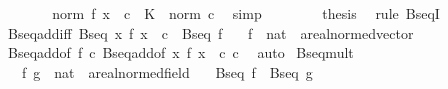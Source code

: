 \begin{isabellebody}
\ \ \ \ \isamarkupfalse%
\ \isamarkupfalse%
\ {\isachardoublequoteopen}norm\ {\isacharparenleft}{\kern0pt}f\ x\ {\isacharplus}{\kern0pt}\ c{\isacharparenright}{\kern0pt}\ {\isasymle}\ K\ {\isacharplus}{\kern0pt}\ norm\ c{\isachardoublequoteclose}\ \isamarkupfalse%
\ simp\isanewline
\ \ \isacommand{{\isacharbraceright}{\kern0pt}}\isamarkupfalse%
\isanewline
\ \ \isamarkupfalse%
\ \isamarkupfalse%
\ {\isacharquery}{\kern0pt}thesis\ \isamarkupfalse%
\ {\isacharparenleft}{\kern0pt}rule\ BseqI{\isacharprime}{\kern0pt}{\isacharparenright}{\kern0pt}\isanewline
{}\isamarkupfalse%
%
\endisatagproof
{\isafoldproof}%
%
\isadelimproof
\isanewline
%
\endisadelimproof
\isanewline
{}\isamarkupfalse%
\ Bseq{\isacharunderscore}{\kern0pt}add{\isacharunderscore}{\kern0pt}iff{\isacharcolon}{\kern0pt}\ {\isachardoublequoteopen}Bseq\ {\isacharparenleft}{\kern0pt}{\isasymlambda}x{\isachardot}{\kern0pt}\ f\ x\ {\isacharplus}{\kern0pt}\ c{\isacharparenright}{\kern0pt}\ {\isasymlongleftrightarrow}\ Bseq\ f{\isachardoublequoteclose}\isanewline
\ \ \ f\ {\isacharcolon}{\kern0pt}{\isacharcolon}{\kern0pt}\ {\isachardoublequoteopen}nat\ {\isasymRightarrow}\ {\isacharprime}{\kern0pt}a{\isacharcolon}{\kern0pt}{\isacharcolon}{\kern0pt}real{\isacharunderscore}{\kern0pt}normed{\isacharunderscore}{\kern0pt}vector{\isachardoublequoteclose}\isanewline
%
\isadelimproof
\ \ %
\endisadelimproof
%
\isatagproof
{}\isamarkupfalse%
\ Bseq{\isacharunderscore}{\kern0pt}add{\isacharbrackleft}{\kern0pt}of\ f\ c{\isacharbrackright}{\kern0pt}\ Bseq{\isacharunderscore}{\kern0pt}add{\isacharbrackleft}{\kern0pt}of\ {\isachardoublequoteopen}{\isasymlambda}x{\isachardot}{\kern0pt}\ f\ x\ {\isacharplus}{\kern0pt}\ c{\isachardoublequoteclose}\ {\isachardoublequoteopen}{\isacharminus}{\kern0pt}c{\isachardoublequoteclose}{\isacharbrackright}{\kern0pt}\ \isamarkupfalse%
\ auto%
\endisatagproof
{\isafoldproof}%
%
\isadelimproof
\isanewline
%
\endisadelimproof
\isanewline
{}\isamarkupfalse%
\ Bseq{\isacharunderscore}{\kern0pt}mult{\isacharcolon}{\kern0pt}\isanewline
\ \ \ f\ g\ {\isacharcolon}{\kern0pt}{\isacharcolon}{\kern0pt}\ {\isachardoublequoteopen}nat\ {\isasymRightarrow}\ {\isacharprime}{\kern0pt}a{\isacharcolon}{\kern0pt}{\isacharcolon}{\kern0pt}real{\isacharunderscore}{\kern0pt}normed{\isacharunderscore}{\kern0pt}field{\isachardoublequoteclose}\isanewline
\ \ \ {\isachardoublequoteopen}Bseq\ f{\isachardoublequoteclose}\ \ {\isachardoublequoteopen}Bseq\ g{\isachardoublequoteclose}\isanewline

\end{isabellebody}
